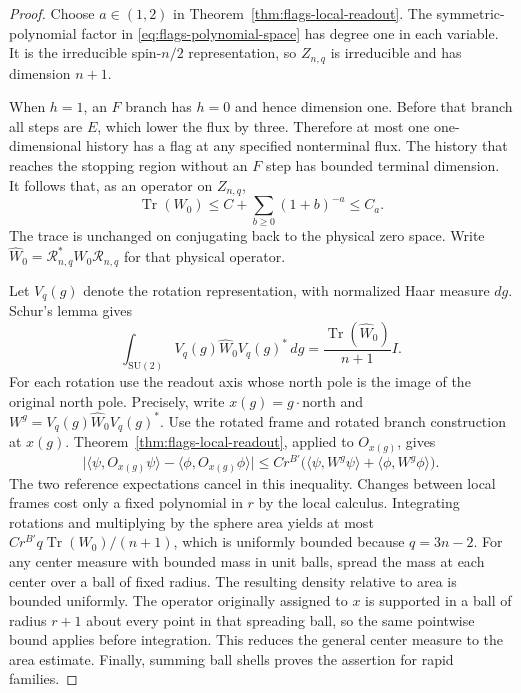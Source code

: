\begin{proof}
Choose $a\in(1,2)$ in Theorem~\ref{thm:flags-local-readout}.  The
symmetric-polynomial factor in \eqref{eq:flags-polynomial-space} has
degree one in each variable.  It is the irreducible spin-$n/2$
representation, so $Z_{n,q}$ is irreducible and has dimension $n+1$.

When $h=1$, an $F$ branch has $h=0$ and hence dimension one.  Before
that branch all steps are $E$, which lower the flux by three.
Therefore at most one one-dimensional history has a flag at any
specified nonterminal flux.  The history that reaches the stopping
region without an $F$ step has bounded terminal dimension.  It follows
that, as an operator on $Z_{n,q}$,
\begin{equation}
 \operatorname{Tr}(W_0)
 \leq C+\sum_{b\geq0}(1+b)^{-a}\leq C_a.
 \label{eq:flags-one-hole-trace}
\end{equation}
The trace is unchanged on conjugating back to the physical zero space.
Write $\widehat W_0=\mathcal R_{n,q}^*W_0\mathcal R_{n,q}$ for that
physical operator.

Let $V_q(g)$ denote the rotation representation, with normalized Haar
measure $dg$.  Schur's lemma gives
\[
 \int_{\mathrm{SU}(2)}V_q(g)\widehat W_0V_q(g)^*\,dg
 =\frac{\operatorname{Tr}(\widehat W_0)}{n+1}I.
\]
For each rotation use the readout axis whose north pole is the image
of the original north pole.  Precisely, write
$x(g)=g\cdot\mathrm{north}$ and
$W^{g}=V_q(g)\widehat W_0V_q(g)^*$.
Use the rotated frame and rotated branch construction at $x(g)$.
Theorem~\ref{thm:flags-local-readout}, applied to $O_{x(g)}$, gives
\[
 \bigl|\langle\psi,O_{x(g)}\psi\rangle
       -\langle\phi,O_{x(g)}\phi\rangle\bigr|
 \leq Cr^{B'}\bigl(\langle\psi,W^g\psi\rangle
                    +\langle\phi,W^g\phi\rangle\bigr).
\]
The two reference expectations cancel in this inequality.
Changes between local frames cost only a fixed polynomial in $r$ by
the local calculus.  Integrating rotations and multiplying by the
sphere area yields at most
$Cr^{B'}q\operatorname{Tr}(W_0)/(n+1)$, which is uniformly bounded
because $q=3n-2$.  For any center measure with bounded mass in unit
balls, spread the mass at each center over a ball of fixed radius.
The resulting density relative to area is bounded uniformly.  The
operator originally assigned to $x$ is supported in a ball of radius
$r+1$ about every point in that spreading ball, so the same pointwise
bound applies before integration.  This reduces the general center
measure to the area estimate.  Finally, summing ball shells proves the
assertion for rapid families.
\end{proof}
